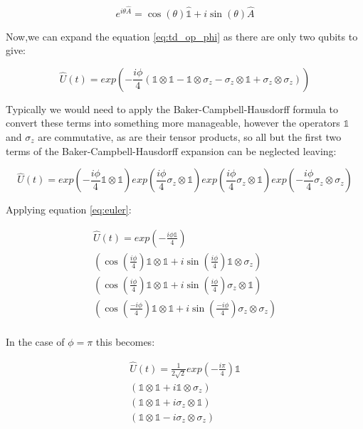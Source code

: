 \begin{equation}
\label{eq:euler}
e^{i  \theta \hat{A}} = \cos(\theta) \hat{\mathbb{1}} + i \sin (\theta) \hat{A}
\end{equation}

Now,we can expand the equation \eqref{eq:td_op_phi} as there are only two qubits to give:

\begin{equation}
\label{eq:td_op_phi_exp}
\hat{U} (t) = exp\left(-\frac{i \phi}{4} \left(\mathbb{1} \otimes \mathbb{1} - \mathbb{1} \otimes \sigma_{z} - \sigma_{z} \otimes \mathbb{1} + \sigma_{z} \otimes \sigma_{z} \right)\right)
\end{equation}

Typically we would need to apply the Baker-Campbell-Hausdorff formula to convert these terms into something more manageable, however the operators $\mathbb{1}$ and $\sigma_{z}$ are commutative, as are their tensor products, so all but the first two terms of the Baker-Campbell-Hausdorff expansion can be neglected leaving:

\begin{equation}
\hat{U} (t) = exp(-\frac{i \phi}{4} \mathbb{1} \otimes \mathbb{1})
exp(\frac{i \phi}{4} \sigma_{z} \otimes \mathbb{1})
exp(\frac{i \phi}{4} \sigma_{z} \otimes \mathbb{1}) 
exp(-\frac{i \phi}{4} \sigma_{z} \otimes \sigma_{z})
\end{equation}

Applying equation \eqref{eq:euler}:

\begin{multline}
\hat{U} (t) = exp(-\frac{i \phi \mathbb{1}}{4}) \\
\left(\cos(\frac{i \phi}{4}) \mathbb{1} \otimes \mathbb{1}
+ i \sin (\frac{i \phi}{4}) \mathbb{1} \otimes \sigma_{z}\right) \\
\left(\cos(\frac{i \phi}{4}) \mathbb{1} \otimes \mathbb{1}
+ i \sin (\frac{i \phi}{4}) \sigma_{z} \otimes \mathbb{1}\right) \\
\left(\cos(\frac{-i \phi}{4}) \mathbb{1} \otimes \mathbb{1}
+ i \sin (\frac{-i \phi}{4}) \sigma_{z} \otimes \sigma_{z}\right) \\
\end{multline}

In the case of $\phi = \pi$ this becomes:

\begin{multline}
\hat{U} (t) = \frac{1}{2 \sqrt{2}}exp(-\frac{i \pi}{4}) \mathbb{1} \\
\left( \mathbb{1} \otimes \mathbb{1}
+ i \mathbb{1} \otimes \sigma_{z}\right) \\
\left( \mathbb{1} \otimes \mathbb{1}
+ i \sigma_{z} \otimes \mathbb{1}\right) \\
\left( \mathbb{1} \otimes \mathbb{1}
- i \sigma_{z} \otimes \sigma_{z}\right) \\
\end{multline}

